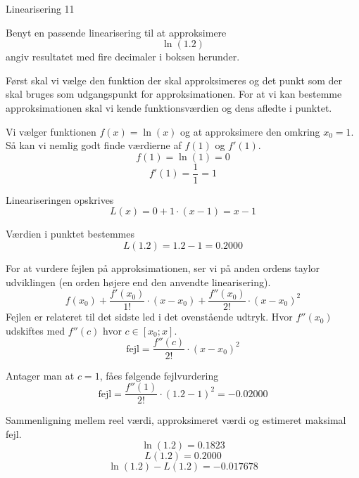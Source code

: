 \documentclass{article}
\begin{document}
\begin{exercise}{Linearisering 11}
	
	Benyt en passende linearisering til at approksimere
	\[
	\ln(1.2)
	\]
	angiv resultatet med fire decimaler i boksen herunder.
	
	\hint
	Først skal vi vælge den funktion der skal approksimeres
	og det punkt som der skal bruges som udgangspunkt for 
	approksimationen.
	For at vi kan bestemme approksimationen skal vi 
	kende funktionsværdien og dens afledte i punktet.
	
	\hint
	Vi vælger funktionen $f(x) = \ln(x)$ og at approksimere den 
	omkring $x_0 = 1$.
	Så kan vi nemlig godt finde værdierne af $f(1)$ og $f'(1)$.
	\[
	f(1) = \ln(1) = 0  
	\]
	\[
	f'(1) = \frac{1}{1} = 1
	\]
	
	\hint
	Lineariseringen opskrives
	\[
	L(x) = 0 + 1 \cdot (x - 1) = x - 1
	\]
	
	\hint
	Værdien i punktet bestemmes
	\[
	L(1.2) = 1.2 - 1 = 0.2000
	\]

	
	\hint
	For at vurdere fejlen på approksimationen, ser vi på anden 
	ordens taylor udviklingen (en orden højere end den 
	anvendte linearisering).
	\[
	f(x_0) 
	+ \frac{f'(x_0)}{1!} \cdot (x - x_0) 
	+ \frac{f''(x_0)}{2!} \cdot (x - x_0)^2
	\]
	Fejlen er relateret til det sidste led i det ovenstående udtryk.
	Hvor $f''(x_0)$ udskiftes med $f''(c)$ hvor $c \in [x_0; x]$.
	\[
	\textrm{fejl} = \frac{f''(c)}{2!} \cdot (x - x_0)^2
	\]
	
	\hint 
	Antager man at $c = 1$, fåes følgende fejlvurdering
	\[
	\textrm{fejl} = \frac{f''(1)}{2!} \cdot (1.2 - 1)^2 = 
	- 0.02000
	\]
	
	\hint
	Sammenligning mellem reel værdi, approksimeret værdi og estimeret maksimal fejl.
	\[
	\ln(1.2)= 0.1823
	\]
	\[
	L(1.2) = 0.2000
	\]
	\[
	\ln(1.2) - L(1.2)  = -0.017678
	\]
	
\end{exercise}
\end{document}
